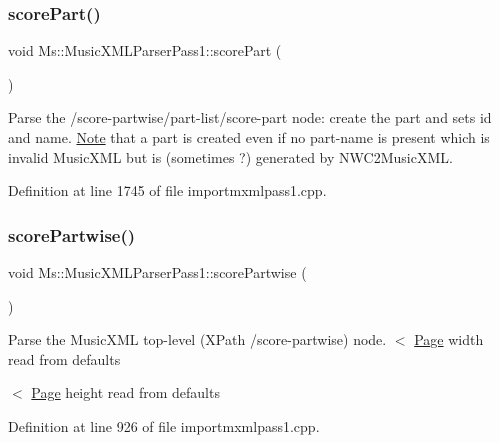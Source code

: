 \subsubsection{\texorpdfstring{score\+Part()}{scorePart()}}
{\footnotesize\ttfamily void Ms\+::\+Music\+X\+M\+L\+Parser\+Pass1\+::score\+Part (\begin{DoxyParamCaption}{ }\end{DoxyParamCaption})}

Parse the /score-\/partwise/part-\/list/score-\/part node\+: create the part and sets id and name. \hyperlink{class_ms_1_1_note}{Note} that a part is created even if no part-\/name is present which is invalid Music\+X\+ML but is (sometimes ?) generated by N\+W\+C2\+Music\+X\+ML. 

Definition at line 1745 of file importmxmlpass1.\+cpp.

\mbox{\label{class_ms_1_1_music_x_m_l_parser_pass1_a4bb6592ded44648255e7181efc672cfb}} 
\subsubsection{\texorpdfstring{score\+Partwise()}{scorePartwise()}}
{\footnotesize\ttfamily void Ms\+::\+Music\+X\+M\+L\+Parser\+Pass1\+::score\+Partwise (\begin{DoxyParamCaption}{ }\end{DoxyParamCaption})}

Parse the Music\+X\+ML top-\/level (X\+Path /score-\/partwise) node. $<$ \hyperlink{class_ms_1_1_page}{Page} width read from defaults

$<$ \hyperlink{class_ms_1_1_page}{Page} height read from defaults 

Definition at line 926 of file importmxmlpass1.\+cpp.

\mbox{\label{class_ms_1_1_music_x_m_l_parser_pass1_a81d212ada3f56a8fecae2df6738caa5f}} 
